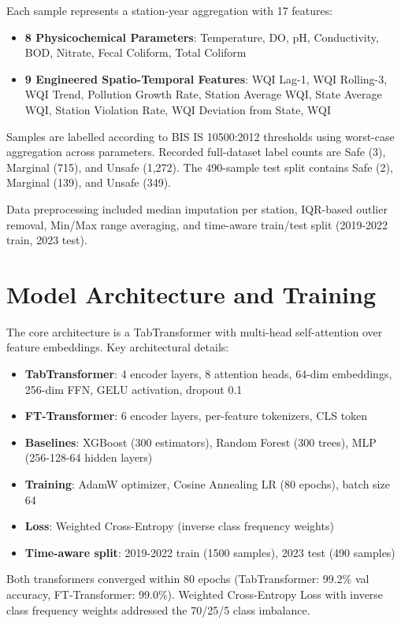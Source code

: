 \documentclass[12pt,a4paper]{report}
\numberwithin{table}{chapter}
\numberwithin{figure}{chapter}
\begin{document}
Each sample represents a station-year aggregation with 17 features:
\begin{itemize}
  \item \textbf{8 Physicochemical Parameters}: Temperature, DO, pH, Conductivity, BOD,
    Nitrate, Fecal Coliform, Total Coliform
  \item \textbf{9 Engineered Spatio-Temporal Features}: WQI Lag-1, WQI Rolling-3,
    WQI Trend, Pollution Growth Rate, Station Average WQI, State Average WQI,
    Station Violation Rate, WQI Deviation from State, WQI
\end{itemize}

Samples are labelled according to BIS IS 10500:2012 thresholds using worst-case
aggregation across parameters. Recorded full-dataset label counts are Safe (3),
Marginal (715), and Unsafe (1,272). The 490-sample test split contains Safe (2),
Marginal (139), and Unsafe (349).

Data preprocessing included median imputation per station, IQR-based outlier removal,
Min/Max range averaging, and time-aware train/test split (2019-2022 train, 2023 test).

\section{Model Architecture and Training}

The core architecture is a TabTransformer with multi-head self-attention over feature
embeddings. Key architectural details:
\begin{itemize}
  \item \textbf{TabTransformer}: 4 encoder layers, 8 attention heads, 64-dim embeddings,
    256-dim FFN, GELU activation, dropout 0.1
  \item \textbf{FT-Transformer}: 6 encoder layers, per-feature tokenizers, CLS token
  \item \textbf{Baselines}: XGBoost (300 estimators), Random Forest (300 trees), MLP
    (256-128-64 hidden layers)
  \item \textbf{Training}: AdamW optimizer, Cosine Annealing LR (80 epochs), batch size 64
  \item \textbf{Loss}: Weighted Cross-Entropy (inverse class frequency weights)
  \item \textbf{Time-aware split}: 2019-2022 train (1500 samples), 2023 test (490 samples)
\end{itemize}

Both transformers converged within 80 epochs (TabTransformer: 99.2\% val accuracy,
FT-Transformer: 99.0\%). Weighted Cross-Entropy Loss with inverse class frequency
weights addressed the 70/25/5 class imbalance.
\end{document}
